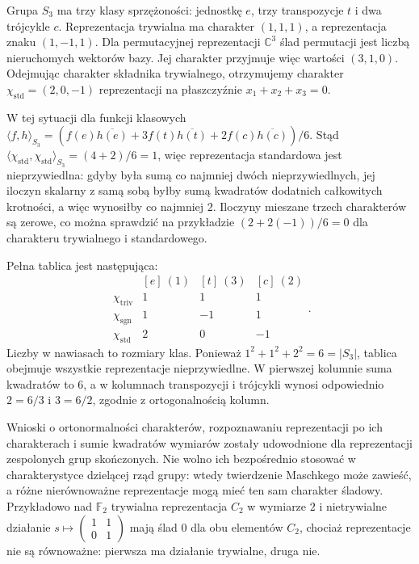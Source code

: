 \begin{przyklad}
\label{aa:prz:character-s3}
Grupa \(S_3\) ma trzy klasy sprzężoności:
jednostkę \(e\), trzy transpozycje \(t\) i dwa
trójcykle \(c\). Reprezentacja trywialna ma charakter
\((1,1,1)\), a reprezentacja znaku \((1,-1,1)\).
Dla permutacyjnej reprezentacji \(\mathbb C^3\)
ślad permutacji jest liczbą nieruchomych wektorów
bazy. Jej charakter przyjmuje więc wartości
\((3,1,0)\). Odejmując charakter składnika
trywialnego, otrzymujemy charakter
\(\chi_{\mathrm{std}}=(2,0,-1)\) reprezentacji
na płaszczyźnie \(x_1+x_2+x_3=0\).

W tej sytuacji dla funkcji klasowych
\(\langle f,h\rangle_{S_3}
=(f(e)\overline{h(e)}
+3f(t)\overline{h(t)}
+2f(c)\overline{h(c)})/6\).
Stąd
\(\langle\chi_{\mathrm{std}},
\chi_{\mathrm{std}}\rangle_{S_3}
=(4+2)/6=1\),
więc reprezentacja standardowa jest nieprzywiedlna:
gdyby była sumą co najmniej dwóch nieprzywiedlnych,
jej iloczyn skalarny z samą sobą byłby sumą
kwadratów dodatnich całkowitych krotności,
a więc wynosiłby co najmniej \(2\).
Iloczyny mieszane trzech charakterów są zerowe,
co można sprawdzić na przykładzie
\((2+2(-1))/6=0\) dla charakteru trywialnego
i standardowego.

Pełna tablica jest następująca:
\[
\begin{array}{c|ccc}
& [e]\ (1)&[t]\ (3)&[c]\ (2)\\ \hline
\chi_{\mathrm{triv}}&1&1&1\\
\chi_{\mathrm{sgn}}&1&-1&1\\
\chi_{\mathrm{std}}&2&0&-1
\end{array}.
\]
Liczby w nawiasach to rozmiary klas. Ponieważ
\(1^2+1^2+2^2=6=|S_3|\), tablica obejmuje
wszystkie reprezentacje nieprzywiedlne.
W pierwszej kolumnie suma kwadratów to \(6\),
a w kolumnach transpozycji i trójcykli
wynosi odpowiednio \(2=6/3\) i \(3=6/2\),
zgodnie z ortogonalnością kolumn.
\end{przyklad}

\begin{uwaga}
\label{aa:rem:characters-limits}
Wnioski o ortonormalności charakterów,
rozpoznawaniu reprezentacji po ich charakterach
i sumie kwadratów wymiarów zostały udowodnione
dla reprezentacji zespolonych grup skończonych.
Nie wolno ich bezpośrednio stosować w
charakterystyce dzielącej rząd grupy:
wtedy twierdzenie Maschkego może zawieść,
a różne nierównoważne reprezentacje mogą mieć
ten sam charakter śladowy. Przykładowo nad
\(\mathbb F_2\) trywialna reprezentacja \(C_2\)
w wymiarze \(2\) i nietrywialne działanie
\(s\mapsto\left(\begin{smallmatrix}1&1\\0&1\end{smallmatrix}\right)\)
mają ślad \(0\) dla obu elementów \(C_2\),
chociaż reprezentacje nie są równoważne:
pierwsza ma działanie trywialne, druga nie.
\end{uwaga}
